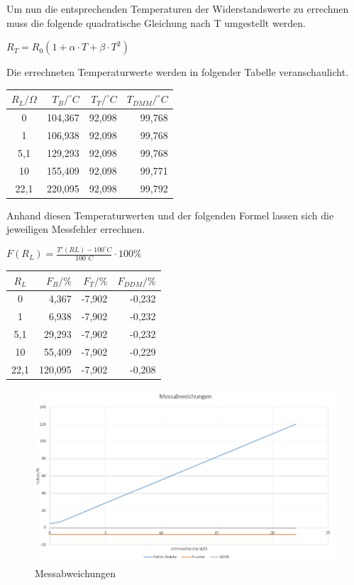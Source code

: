 \documentclass[a4paper,11pt,oneside]{article}
\begin{document}
Um nun die entsprechenden Temperaturen der Widerstandswerte zu errechnen muss die folgende quadratische Gleichung nach T umgestellt werden.\\
\begin{center}
$R_T=R_0(1+\alpha \cdot T+\beta \cdot T^2)$
\end{center}
Die errechneten Temperaturwerte werden in folgender Tabelle veranschaulicht.
\begin{center}
\begin{tabular}{|c|r|r|r|}
\hline 
$R_L/\Omega$ & $T_B/^\circ C$ & $T_T/^\circ C$ & $T_{DMM}/^\circ C$ \\ 
\hline 
0 & 104,367& 92,098 & 99,768 \\ 
\hline 
1 & 106,938 & 92,098 & 99,768 \\ 
\hline 
5,1 & 129,293 & 92,098 & 99,768 \\ 
\hline 
10 & 155,409 & 92,098 & 99,771 \\ 
\hline 
22,1 & 220,095 & 92,098 & 99,792 \\ 
\hline 
\end{tabular} 
\end{center}
\vspace{1cm}
Anhand diesen Temperaturwerten und der folgenden Formel lassen sich die jeweiligen Messfehler errechnen.\\
\begin{center}
$F(R_L)=\frac{T'(RL)-100^\circ C}{100^\circ C}\cdot 100\%$
\end{center}
\vspace{1cm}
\begin{center}
\begin{tabular}{|c|r|r|r|}
\hline 
$R_L$ & $F_B/\%$ & $F_T/\%$ & $F_{DDM}/\%$ \\ 
\hline 
0 & 4,367 & -7,902 & -0,232 \\ 
\hline 
1 & 6,938 & -7,902 & -0,232 \\ 
\hline 
5,1 & 29,293 & -7,902 & -0,232 \\ 
\hline 
10 & 55,409 & -7,902 & -0,229 \\ 
\hline 
22,1 & 120,095 & -7,902 & -0,208 \\ 
\hline 
\end{tabular} 
\end{center}
\begin{figure}[hbtp]
\centering
\includegraphics[scale=0.7]{Bilder/Diagramm_Messabweichungen.png}
\caption{Messabweichungen}
\end{figure}
\end{document}
